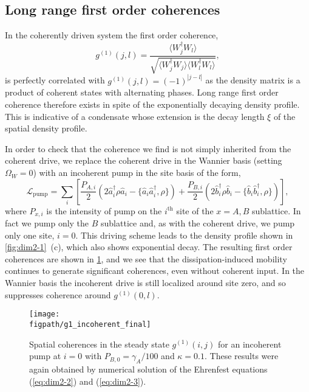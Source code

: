 \subsection{Long range first order coherences}
In the coherently driven system the first order coherence,
\begin{equation}
	g^{(1)}(j,l) = \frac{\langle W_{j}^{\dagger}W_{l} \rangle}{\sqrt{\langle W_{j}^{\dagger}W_{j} \rangle \langle W_{l}^{\dagger}W_{l} \rangle}},
	\label{eq:dim2-5}
\end{equation}
is perfectly correlated with \(g^{(1)}(j,l) = (-1)^{|j-l|}\) as the density matrix is a product of coherent states with alternating phases. Long range first order coherence therefore exists in spite of the exponentially decaying density profile. This is indicative of a condensate whose extension is the decay length \(\xi\) of the spatial density profile.

In order to check that the coherence we find is not simply inherited from the coherent drive, we replace the coherent drive in the Wannier basis (setting \(\Omega_{W} = 0\)) with an incoherent pump in the site basis of the form,
\begin{equation}
	\mathcal{L}_{\mathrm{pump}} = \sum_{i}\left[\frac{P_{A,i}}{2}\left(2\hat{a}_{i}^{\dagger}\rho\hat{a}_{i} - \{\hat{a}_{i}\hat{a}_{i}^{\dagger}, \rho\}\right) + \frac{P_{B,i}}{2}\left(2\hat{b}_{i}^{\dagger}\rho\hat{b}_{i} - \{\hat{b}_{i}\hat{b}_{i}^{\dagger}, \rho\}\right) \right],
	\label{eq:dim2-6}
\end{equation}
where \(P_{x,i}\) is the intensity of pump on the \(i^{\mathrm{th}}\) site of the \(x = A,B\) sublattice. In fact we pump only the \(B\) sublattice and, as with the coherent drive, we pump only one site, \(i=0\). This driving scheme leads to the density profile shown in \cref{fig:dim2-1}~(c), which also shows exponential decay. The resulting first order coherences are shown in \cref{fig:dim2-3}, and we see that the dissipation-induced mobility continues to generate significant coherences, even without coherent input. In the Wannier basis the incoherent drive is still localized around site zero, and so suppresses coherence around \(g^{(1)}(0,l)\).

\begin{figure}[ht!]
\centering
\texttt{[image: \\figpath/g1\_incoherent\_final]}
\caption{\label{fig:dim2-3}Spatial coherences in the steady state \(g^{(1)}(i,j)\) for an incoherent pump at \(i=0\) with \(P_{B,0} = \gamma_{A}/100\) and \(\kappa = 0.1\). These results were again obtained by numerical solution of the Ehrenfest equations (\ref{eq:dim2-2}) and (\ref{eq:dim2-3}).}
\end{figure}

